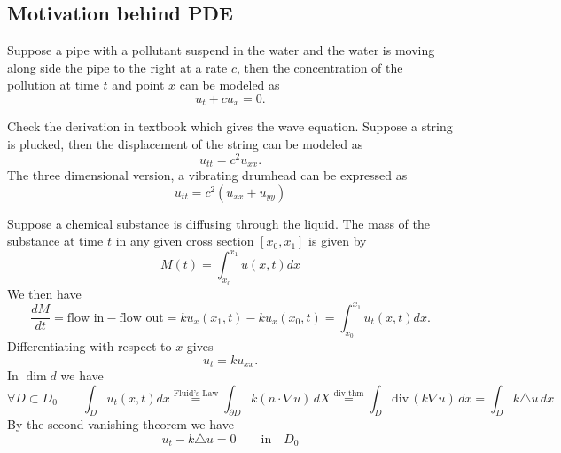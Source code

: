 \subsection{Motivation behind PDE}
\begin{example}[Transport]
	Suppose a pipe with a pollutant suspend in the water and the water is moving along side the pipe to the right at a rate $c$, then the concentration of the pollution at time $t$ and point $x$ can be modeled as
	\[ u_t  + c u_x = 0.\]
\end{example}
\begin{example}
	Check the derivation in textbook which gives the wave equation. Suppose a string is plucked, then the displacement of the string can be modeled as
	\[ u_{tt} = c^2 u_{xx}.\]
	The three dimensional version, a vibrating drumhead can be expressed as
	\[ u_{tt} = c^2 \left( u_{xx} + u_{yy} \right) \]
\end{example}
\begin{example}[Diffusion]
	Suppose a chemical substance is diffusing through the liquid. The mass of the substance at time $t$ in any given cross section $[x_0,x_1]$ is given by
	\[ M(t) = \int_{x_0}^{x_1} u(x,t) dx\]
	We then have
	\[ \frac{dM}{dt} = \text{flow in} - \text{flow out} = ku_x(x_1,t) - ku_x(x_0,t) = \int_{x_0}^{x_1} u_t(x,t) dx.\]
	Differentiating with respect to $x$ gives
	\[u_t = k u_{xx}.\]
	In $\dim d$ we have 
	\[ \forall D \subset D_0 \qquad \int_D u_t(x,t) dx \stackrel{\text{Fluid's Law}}{=} \int_{\partial D} k(n \cdot \nabla u) \, dX \stackrel{\text{div thm}}{=} \int_{D} \mathrm{div}\,(k\nabla u)\, dx = \int_D k \triangle u\, dx\]
	By the second vanishing theorem we have
	\[ u_t - k \triangle u = 0 \qquad \mathrm{in} \quad D_0\]
\end{example}